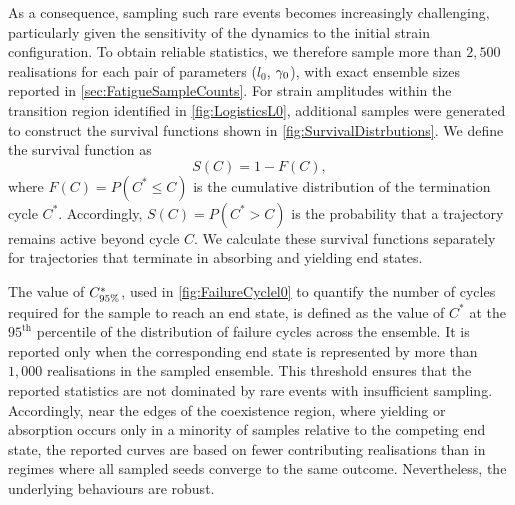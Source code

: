 
As a consequence, sampling such rare events becomes increasingly challenging, particularly given the sensitivity of the dynamics to the initial strain configuration. To obtain reliable statistics, we therefore sample more than $2{,}500$ realisations for each pair of parameters ($l_0$, $\gamma_0$), with exact ensemble sizes reported in \cref{sec:FatigueSampleCounts}. For strain amplitudes within the transition region identified in \cref{fig:LogisticsL0}, additional samples were generated to construct the survival functions shown in \cref{fig:SurvivalDistrbutions}. We define the survival function as
\[
S(C)=1-F(C),
\]
where $F(C)=P(C^*\leq C)$ is the cumulative distribution of the termination cycle $C^*$. Accordingly, $S(C)=P(C^*>C)$ is the probability that a trajectory remains active beyond cycle $C$. We calculate these survival functions separately for trajectories that terminate in absorbing and yielding end states.

The value of $C^\ast_{95\%}$, used in \cref{fig:FailureCyclel0} to quantify the number of cycles required for the sample to reach an end state, is defined as the value of $C^*$ at the $95^\textrm{th}$ percentile of the distribution of failure cycles across the ensemble. It is reported only when the corresponding end state is represented by more than $1{,}000$ realisations in the sampled ensemble. This threshold ensures that the reported statistics are not dominated by rare events with insufficient sampling. Accordingly, near the edges of the coexistence region, where yielding or absorption occurs only in a minority of samples relative to the competing end state, the reported curves are based on fewer contributing realisations than in regimes where all sampled seeds converge to the same outcome. Nevertheless, the underlying behaviours are robust.

